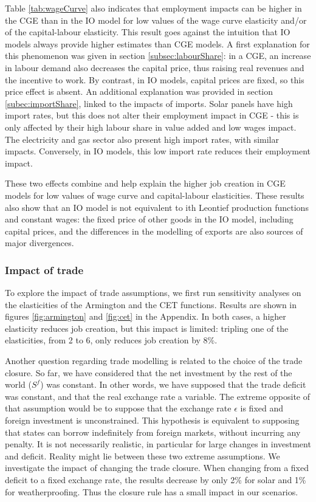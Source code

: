 Table \ref{tab:wageCurve} also indicates that employment impacts can be higher in the CGE than in the IO model for low values of the wage curve elasticity and/or of the capital-labour elasticity.
This result goes against the intuition that IO models always provide higher estimates than CGE models.
A first explanation for this phenomenon was given in section \ref{subsec:labourShare}: in a CGE, an increase in labour demand also decreases the capital price, thus raising real revenues and the incentive to work. By contrast, in IO models, capital prices are fixed, so this price effect is absent.
An additional explanation was provided in section \ref{subec:importShare}, linked to the impacts of imports. Solar panels have high import rates, but this does not alter their employment impact in CGE - this is only affected by their high labour share in value added and low wages impact. The electricity and gas sector also present high import rates, with similar impacts. Conversely, in IO models, this low import rate reduces their employment impact.

These two effects combine and help explain the higher job creation in CGE models for low values of wage curve and capital-labour elasticities. These results also show that an IO model is not equivalent to ith Leontief production functions and constant wages: the fixed price of other goods in the IO model, including capital prices, and the differences in the modelling of exports are also sources of major divergences.

\subsubsection{Impact of trade}
To explore the impact of trade assumptions, we first run sensitivity analyses on the elasticities of the Armington and the CET functions. Results are shown in figures \ref{fig:armington} and \ref{fig:cet} in the Appendix.
In both cases, a higher elasticity reduces job creation, but this impact is limited: tripling one of the elasticities, from 2 to 6, only reduces job creation by 8\%.

Another question regarding trade modelling is related to the choice of the trade closure. So far, we have considered that the net investment by the rest of the world ($S^f$) was constant. In other words, we have supposed that the trade deficit was constant, and that the real exchange rate a variable.
The extreme opposite of that assumption would be to suppose that the exchange rate $\epsilon$ is fixed and foreign investment is unconstrained. This hypothesis is equivalent to supposing that states can borrow indefinitely from foreign markets, without incurring any penalty. It is not necessarily realistic, in particular for large changes in investment and deficit. Reality might lie between these two extreme assumptions. 
We investigate the impact of changing the trade closure. When changing from a fixed deficit to a fixed exchange rate, the results decrease by only 2\% for solar and 1\% for weatherproofing. Thus the closure rule has a small impact in our scenarios.

